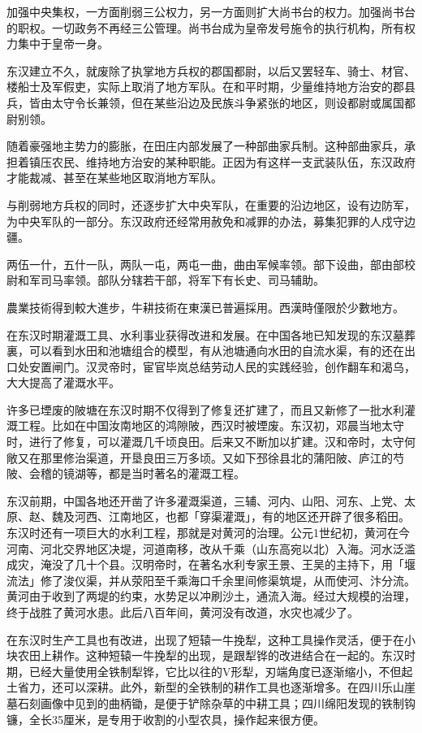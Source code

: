 加强中央集权，一方面削弱三公权力，另一方面则扩大尚书台的权力。加强尚书台的职权。一切政务不再经三公管理。尚书台成为皇帝发号施令的执行机构，所有权力集中于皇帝一身。

东汉建立不久，就废除了执掌地方兵权的郡国都尉，以后又罢轻车、骑士、材官、楼船士及军假吏，实际上取消了地方军队。在和平时期，少量维持地方治安的郡县兵，皆由太守令长兼领，但在某些沿边及民族斗争紧张的地区，则设都尉或属国都尉别领。

随着豪强地主势力的膨胀，在田庄内部发展了一种部曲家兵制。这种部曲家兵，承担着镇压农民、维持地方治安的某种职能。正因为有这样一支武装队伍，东汉政府才能裁减、甚至在某些地区取消地方军队。

与削弱地方兵权的同时，还逐步扩大中央军队，在重要的沿边地区，设有边防军，为中央军队的一部分。东汉政府还经常用赦免和减罪的办法，募集犯罪的人戍守边疆。

两伍一什，五什一队，两队一屯，两屯一曲，曲由军候率领。部下设曲，部由部校尉和军司马率领。部队分辖若干部，将军下有长史、司马辅助。

農業技術得到較大進步，牛耕技術在東漢已普遍採用。西漢時僅限於少數地方。

在东汉时期灌溉工具、水利事业获得改进和发展。在中国各地已知发现的东汉墓葬裏，可以看到水田和池塘组合的模型，有从池塘通向水田的自流水渠，有的还在出口处安置闸门。汉灵帝时，宦官毕岚总结劳动人民的实践经验，创作翻车和渴乌，大大提高了灌溉水平。

许多已堙废的陂塘在东汉时期不仅得到了修复还扩建了，而且又新修了一批水利灌溉工程。比如在中国汝南地区的鸿隙陂，西汉时被堙废。东汉初，邓晨当地太守时，进行了修复，可以灌溉几千顷良田。后来又不断加以扩建。汉和帝时，太守何敞又在那里修治渠道，开垦良田三万多顷。又如下邳徐县北的蒲阳陂、庐江的芍陂、会稽的镜湖等，都是当时著名的灌溉工程。

东汉前期，中国各地还开凿了许多灌溉渠道，三辅、河内、山阳、河东、上党、太原、赵、魏及河西、江南地区，也都「穿渠灌溉」，有的地区还开辟了很多稻田。东汉时还有一项巨大的水利工程，那就是对黄河的治理。公元1世纪初，黄河在今河南、河北交界地区决堤，河道南移，改从千乘（山东高宛以北）入海。河水泛滥成灾，淹没了几十个县。汉明帝时，在著名水利专家王景、王吴的主持下，用「堰流法」修了浚仪渠，并从荥阳至千乘海口千余里间修渠筑堤，从而使河、汴分流。黄河由于收到了两堤的约束，水势足以冲刷沙土，通流入海。经过大规模的治理，终于战胜了黄河水患。此后八百年间，黄河没有改道，水灾也减少了。

在东汉时生产工具也有改进，出现了短辕一牛挽犁，这种工具操作灵活，便于在小块农田上耕作。这种短辕一牛挽犁的出现，是跟犁铧的改进结合在一起的。东汉时期，已经大量使用全铁制犁铧，它比以往的V形犁，刃端角度已逐渐缩小，不但起土省力，还可以深耕。此外，新型的全铁制的耕作工具也逐渐增多。在四川乐山崖墓石刻画像中见到的曲柄锄，是便于铲除杂草的中耕工具；四川绵阳发现的铁制钩镰，全长35厘米，是专用于收割的小型农具，操作起来很方便。

